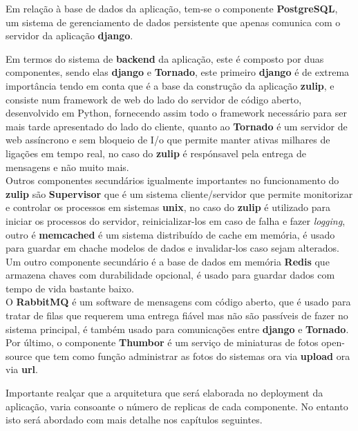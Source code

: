 Em relação à base de dados da aplicação, tem-se o componente \textbf{PostgreSQL}, um sistema de gerenciamento de dados persistente que apenas comunica com o servidor da aplicação \textbf{django}.
\newline

Em termos do sistema de \textbf{backend} da aplicação, este é composto por duas componentes, sendo elas \textbf{django} e \textbf{Tornado}, este primeiro \textbf{django} é de extrema importância tendo em conta que é a base da construção da aplicação \textbf{zulip}, e consiste num framework de web do lado do servidor de código aberto, desenvolvido em Python, fornecendo assim todo o framework necessário para ser mais tarde apresentado do lado do cliente, quanto ao \textbf{Tornado} é um servidor de web assíncrono e sem bloqueio de I/o que permite manter ativas milhares de ligações em tempo real, no caso do \textbf{zulip} é respónsavel pela entrega de mensagens e não muito mais.\\ 

Outros componentes secundários igualmente importantes no funcionamento do \textbf{zulip} são \textbf{Supervisor} que é um sistema cliente/servidor que permite monitorizar e controlar os processos em sistemas \textbf{unix}, no caso do \textbf{zulip} é utilizado para iniciar os processos do servidor, reinicializar-los em caso de falha e fazer \emph{logging}, outro é \textbf{memcached} é um sistema distribuído de cache em memória, é usado para guardar em chache modelos de dados e invalidar-los caso sejam alterados.\\

Um outro componente secundário é a base de dados em memória \textbf{Redis} que armazena chaves com durabilidade opcional, é usado para guardar dados com tempo de vida bastante baixo.\\ O \textbf{RabbitMQ} é um software de mensagens com código aberto, que é usado para tratar de filas que requerem uma entrega fiável mas não são passíveis de fazer no sistema principal, é também usado para comunicações entre \textbf{django} e \textbf{Tornado}.\\ Por último, o componente \textbf{Thumbor} é um serviço de miniaturas de fotos open-source que tem como função administrar as fotos do sistemas ora via \textbf{upload} ora via \textbf{url}.\newline

Importante realçar que a arquitetura que será elaborada no deployment da aplicação, varia consoante o número de replicas de cada componente. No entanto isto será abordado com mais detalhe nos capítulos seguintes.
